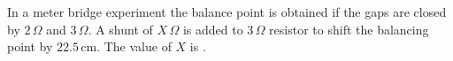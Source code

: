 \item In a meter bridge experiment the balance point is obtained if the gaps are closed by $2\,\Omega$ and $3\,\Omega$. A shunt of $X\,\Omega$ is added to $3\,\Omega$ resistor to shift the balancing point by $22.5\,\text{cm}$. The value of $X$ is \underline{\hspace{2.5cm}}.